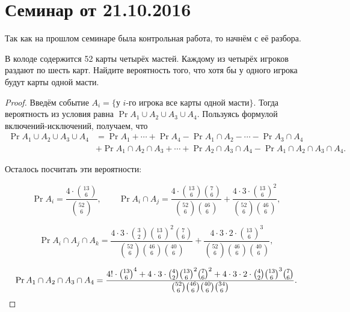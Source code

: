 \section{Семинар от 21.10.2016}
Так как на прошлом семинаре была контрольная работа, то начнём с её разбора.
\begin{problem}
    В колоде содержится 52 карты четырёх мастей. Каждому из четырёх игроков раздают по шесть карт. Найдите вероятность того, что хотя бы у одного игрока будут карты одной масти.
\end{problem}
\begin{proof}
    Введём событие \(A_i = \{\)у \(i\)-го игрока все карты одной масти\(\}\). Тогда вероятность из условия равна \(\Pr{A_1 \cup A_2 \cup A_3 \cup A_4}\). Пользуясь формулой включений-исклю\-чений, получаем, что
    \[\begin{aligned}
    \Pr{A_1 \cup A_2 \cup A_3 \cup A_4} &= \Pr{A_1} + \dotsb + \Pr{A_4} - \Pr{A_1 \cap A_2} - \dotsb - \Pr{A_3 \cap A_4} \\ &+ \Pr{A_1 \cap A_2 \cap A_3} + \dotsb + \Pr{A_2 \cap A_3 \cap A_4} - \Pr{A_1 \cap A_2 \cap A_3 \cap A_4}.
    \end{aligned}\]
    
    Осталось посчитать эти вероятности:
    
    \[\Pr{A_i} = \frac{4 \cdot \binom{13}{6}}{\binom{52}{6}},\qquad \Pr{A_i \cap A_j} = \frac{4 \cdot \binom{13}{6}\binom{7}{6}}{\binom{52}{6}\binom{46}{6}} + \frac{4 \cdot 3 \cdot \binom{13}{6}^2}{\binom{52}{6}\binom{46}{6}},\]
    
    \[\Pr{A_i \cap A_j \cap A_k} = \frac{4 \cdot 3 \cdot \binom{3}{2}\binom{13}{6}^2\binom{7}{6}}{\binom{52}{6}\binom{46}{6}\binom{40}{6}} + \frac{4 \cdot 3 \cdot 2 \cdot \binom{13}{6}^3}{\binom{52}{6}\binom{46}{6}\binom{40}{6}},\]
    
    \[\Pr{A_1 \cap A_2 \cap A_3 \cap A_4} = \frac{4!\cdot \binom{13}{6}^4 + 4 \cdot 3 \cdot \binom{4}{2}\binom{13}{6}^2\binom{7}{6}^2 + 4 \cdot 3 \cdot 2 \cdot \binom{4}{2}\binom{13}{6}^3\binom{7}{6}}{\binom{52}{6}\binom{46}{6}\binom{40}{6}\binom{34}{6}}.\qedhere\]
\end{proof}

